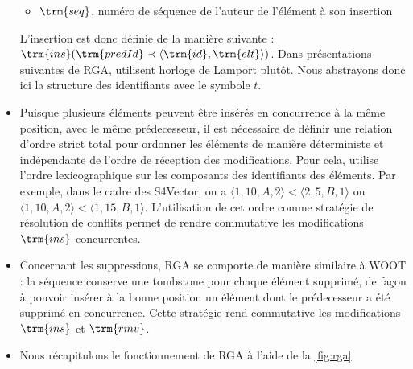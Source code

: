 \begin{itemize}
\begin{itemize}
      \item $\trm{seq}$, numéro de séquence de l'auteur de l'élément à son insertion
    \end{itemize}
    L'insertion est donc définie de la manière suivante : $\trm{ins}(\trm{predId} \prec \langle \trm{id},\trm{elt} \rangle)$.
    Dans présentations suivantes de \ac{RGA}, utilisent horloge de Lamport \cite{1978-happen-before-lamport} plutôt.
    Nous abstrayons donc ici la structure des identifiants avec le symbole $t$.
  \item Puisque plusieurs éléments peuvent être insérés en concurrence à la même position, \ie avec le même prédecesseur, il est nécessaire de définir une relation d'ordre strict total pour ordonner les éléments de manière déterministe et indépendante de l'ordre de réception des modifications.
    Pour cela, utilise l'ordre lexicographique sur les composants des identifiants des éléments.
    Par exemple, dans le cadre des S4Vector, on a $\langle 1, 10, A, 2\rangle < \langle 2, 5, B, 1 \rangle$ ou $\langle 1, 10, A, 2 \rangle < \langle 1, 15, B, 1 \rangle$.
    L'utilisation de cet ordre comme stratégie de résolution de conflits permet de rendre commutative les modifications $\trm{ins}$ concurrentes.
  \item Concernant les suppressions, \ac{RGA} se comporte de manière similaire à WOOT : la séquence conserve une tombstone pour chaque élément supprimé, de façon à pouvoir insérer à la bonne position un élément dont le prédecesseur a été supprimé en concurrence.
    Cette stratégie rend commutative les modifications $\trm{ins}$ et $\trm{rmv}$.
  \item Nous récapitulons le fonctionnement de \ac{RGA} à l'aide de la \autoref{fig:rga}.
    \begin{figure}[!ht]

      \centering
\end{figure}
\end{itemize}
